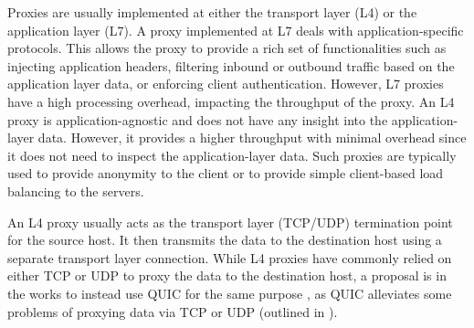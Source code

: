 Proxies are usually implemented at either the transport layer (L4) or the application layer (L7).
A proxy implemented at L7 deals with application-specific protocols.
This allows the proxy to provide a rich set of functionalities such as injecting application headers, filtering inbound or outbound traffic based on the application layer data, or enforcing client authentication.
However, L7 proxies have a high processing overhead, impacting the throughput of the proxy.
An L4 proxy is application-agnostic and does not have any insight into the application-layer data.
However, it provides a higher throughput with minimal overhead since it does not need to inspect the application-layer data.
Such proxies are typically used to provide anonymity to the client or to provide simple client-based load balancing to the servers.

An L4 proxy usually acts as the transport layer (TCP/UDP) termination point for the source host.
It then transmits the data to the destination host using a separate transport layer connection.
While L4 proxies have commonly relied on either TCP or UDP to proxy the data to the destination host, a proposal is in the works to instead use QUIC for the same purpose \cite{quic_masque}, as QUIC alleviates some problems of proxying data via TCP or UDP (outlined in ).



\endinput

Do we want to talk more about L4 and L7 proxies and their implementations?